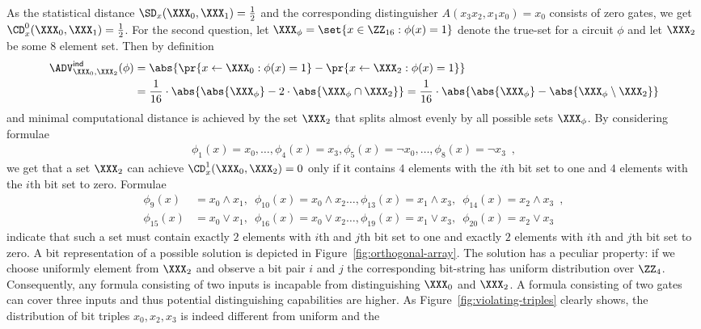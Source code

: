 \documentclass{crypto-exercise}
\begin{document}
\begin{solution}
As the statistical distance $\SD_x(\XXX_0,\XXX_1)=\frac{1}{2}$ and the
corresponding distinguisher $A(x_3x_2,x_1x_0)=x_0$ consists of zero
gates, we get $\CD_x^0(\XXX_0,\XXX_1)=\frac{1}{2}$. For the second
question, let $\XXX_\phi=\set{x\in\ZZ_{16}: \phi(x)=1}$ denote the
true-set for a circuit $\phi$ and let $\XXX_2$ be some $8$ element
set. Then by definition
\begin{align*}
  \advINDXX{\XXX_0,\XXX_2}{\phi}%
  &=\abs{\pr{x\gets\XXX_0: \phi(x)=1}-\pr{x\gets\XXX_2: \phi(x)=1}}\\
  &=\frac{1}{16}\cdot\abs{\abs{\XXX_\phi}-2\cdot\abs{\XXX_\phi\cap \XXX_2}}
  =\frac{1}{16}\cdot\abs{\abs{\XXX_\phi}-\abs{\XXX_\phi\setminus\XXX_2}}
\end{align*}
and minimal computational distance is achieved by the set $\XXX_2$
that splits almost evenly by all possible sets $\XXX_\phi$. By
considering formulae
\begin{align*}
 \phi_1(x)=x_0,\ldots, \phi_4(x)=x_3,
\phi_5(x)=\neg x_0,\ldots,\phi_8(x)=\neg x_3\enspace,  
\end{align*}
we get that a set $\XXX_2$ can achieve $\CD_x^1(\XXX_0,\XXX_2)=0$ only
if it contains $4$ elements with the $i$th bit set to one and $4$
elements with the $i$th bit set to zero. Formulae
\begin{align*}
  \phi_9(x)&=x_0\wedge x_1,\enspace
  \phi_{10}(x)=x_0\wedge x_2 \ldots,
  \phi_{13}(x)=x_1\wedge x_3,\enspace
  \phi_{14}(x)=x_2\wedge x_3\enspace,\\
  \phi_{15}(x)&=x_0\vee x_1,\enspace
  \phi_{16}(x)=x_0\vee x_2 \ldots,
  \phi_{19}(x)=x_1\vee x_3,\enspace
  \phi_{20}(x)=x_2\vee x_3\enspace
\end{align*}
indicate that such a set must contain exactly $2$ elements with $i$th
and $j$th bit set to one and exactly $2$ elements with $i$th and $j$th
bit set to zero.  A bit representation of a possible solution is
depicted in Figure~\ref{fig:orthogonal-array}. The solution has a
peculiar property: if we choose uniformly element from $\XXX_2$ and
observe a bit pair $i$ and $j$ the corresponding bit-string has
uniform distribution over $\ZZ_4$. Consequently, any formula
consisting of two inputs is incapable from distinguishing $\XXX_0$ and
$\XXX_2$. A formula consisting of two gates can cover three inputs and
thus potential distinguishing capabilities are higher.  As
Figure~\ref{fig:violating-triples} clearly shows, the distribution of
bit triples $x_0,x_2,x_3$ is indeed different from uniform and the

\end{solution}
\end{document}
